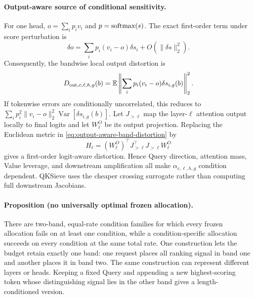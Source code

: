 \paragraph{Output-aware source of conditional sensitivity.}
For one head, $o=\sum_ip_iv_i$ and $p=\operatorname{softmax}(s)$.  The exact first-order
term under score perturbation is
\begin{equation}
 \delta o
 =
 \sum_i p_i(v_i-o)\delta s_i
 +O(\|\delta s\|_2^2).
 \label{eq:attention-local-jacobian}
\end{equation}
Consequently, the bandwise local output distortion is
\begin{equation}
 D_{{\rm out},c,\ell,h,g}(b)
 =
 \mathbb E\left\|
  \sum_i p_i(v_i-o)\delta s_{i,g}(b)
 \right\|_2^2 .
 \label{eq:output-aware-band-distortion}
\end{equation}
If tokenwise errors are conditionally uncorrelated, this reduces to
$\sum_i p_i^2\|v_i-o\|_2^2
\operatorname{Var}[\delta s_{i,g}(b)]$.
Let $J_{>\ell}$ map the layer-$\ell$ attention output locally to final
logits and let $W_\ell^O$ be its output projection.  Replacing the Euclidean
metric in \cref{eq:output-aware-band-distortion} by
\begin{equation}
 H_\ell=(W_\ell^O)^\top J_{>\ell}^\top J_{>\ell}W_\ell^O
 \label{eq:layer-output-metric}
\end{equation}
gives a first-order logit-aware distortion.  Hence Query direction,
attention mass, Value leverage, and downstream amplification all make
$\alpha_{c,\ell,h,g}$ condition dependent.  QKSieve uses the cheaper
crossing surrogate rather than computing full downstream Jacobians.

\paragraph{Proposition (no universally optimal frozen allocation).}
There are two-band, equal-rate condition families for which every frozen
allocation fails on at least one condition, while a condition-specific
allocation succeeds on every condition at the same total rate.  One
construction lets the budget retain exactly one band: one request places
all ranking signal in band one and another places it in band two.  The same
construction can represent different layers or heads.  Keeping a fixed
Query and appending a new highest-scoring token whose distinguishing signal
lies in the other band gives a length-conditioned version.

